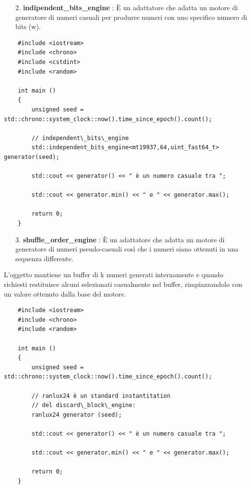 \begin{enumerate}
	\item[2.] \textsf{\small \textbf{indipendent\_bits\_engine} : È un adattatore che adatta un motore di generatore di numeri casuali per produrre numeri con uno specifico numero di bits (w).}
\end{enumerate}

\begin{lstlisting}
	#include <iostream>
	#include <chrono>
	#include <cstdint>
	#include <random>
	
	int main ()
	{
		unsigned seed = std::chrono::system_clock::now().time_since_epoch().count();
		
		// independent\_bits\_engine
		std::independent_bits_engine<mt19937,64,uint_fast64_t> generator(seed);
		
		std::cout << generator() << " è un numero casuale tra ";
		
		std::cout << generator.min() << " e " << generator.max();
		
		return 0;
	}
\end{lstlisting}

\begin{enumerate}
	\item[3.] \textsf{\small \textbf{shuffle\_order\_engine} : È un adattatore che adatta un motore di generatore di numeri pseudo-casuali così che i numeri siano ottenuti in una sequenza differente.}
\end{enumerate}

\textsf{\small L'oggetto mantiene un buffer di k numeri generati internamente e quando richiesti restituisce alcuni selezionati casualmente nel buffer, rimpiazzandolo con un valore ottenuto dalla base del motore.} \\

\begin{lstlisting}
	#include <iostream>
	#include <chrono>
	#include <random>
	
	int main ()
	{
		unsigned seed = std::chrono::system_clock::now().time_since_epoch().count();
		
		// ranlux24 è un standard instantitation
		// del discard\_block\_engine:
		ranlux24 generator (seed);
		
		std::cout << generator() << " è un numero casuale tra ";
		
		std::cout << generator.min() << " e " << generator.max();
		
		return 0;
	}
\end{lstlisting}

